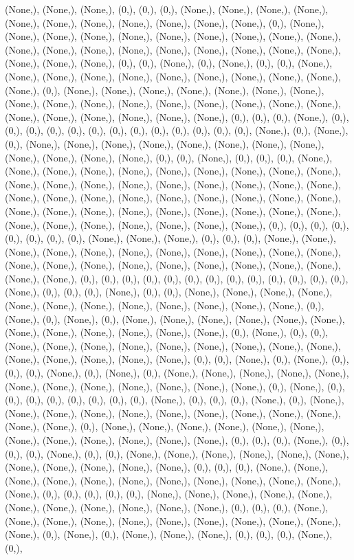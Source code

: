 \documentclass{article}
\begin{document}
(None,), (None,), (None,), (0,), (0,), (0,), (None,), (None,), (None,), (None,), (None,), (None,), (None,), (None,), (None,), (None,), (None,), (0,), (None,), (None,), (None,), (None,), (None,), (None,), (None,), (None,), (None,), (None,), (None,), (None,), (None,), (None,), (None,), (None,), (None,), (None,), (None,), (None,), (None,), (None,), (0,), (0,), (None,), (0,), (None,), (0,), (0,), (None,), (None,), (None,), (None,), (None,), (None,), (None,), (None,), (None,), (None,), (None,), (0,), (None,), (None,), (None,), (None,), (None,), (None,), (None,), (None,), (None,), (None,), (None,), (None,), (None,), (None,), (None,), (None,), (None,), (None,), (None,), (None,), (None,), (None,), (0,), (0,), (0,), (None,), (0,), (0,), (0,), (0,), (0,), (0,), (0,), (0,), (0,), (0,), (0,), (0,), (0,), (None,), (0,), (None,), (0,), (None,), (None,), (None,), (None,), (None,), (None,), (None,), (None,), (None,), (None,), (None,), (None,), (0,), (0,), (None,), (0,), (0,), (0,), (None,), (None,), (None,), (None,), (None,), (None,), (None,), (None,), (None,), (None,), (None,), (None,), (None,), (None,), (None,), (None,), (None,), (None,), (None,), (None,), (None,), (None,), (None,), (None,), (None,), (None,), (None,), (None,), (None,), (None,), (None,), (None,), (None,), (None,), (None,), (None,), (None,), (None,), (None,), (None,), (None,), (None,), (None,), (None,), (0,), (0,), (0,), (0,), (0,), (0,), (0,), (0,), (None,), (None,), (None,), (0,), (0,), (0,), (None,), (None,), (None,), (None,), (None,), (None,), (None,), (None,), (None,), (None,), (None,), (None,), (None,), (None,), (None,), (None,), (None,), (None,), (None,), (None,), (None,), (None,), (0,), (0,), (0,), (0,), (0,), (0,), (0,), (0,), (0,), (0,), (0,), (0,), (0,), (None,), (0,), (0,), (0,), (None,), (0,), (0,), (None,), (None,), (None,), (None,), (None,), (None,), (None,), (None,), (None,), (None,), (None,), (None,), (0,), (None,), (0,), (None,), (0,), (None,), (None,), (None,), (None,), (None,), (None,), (None,), (None,), (None,), (None,), (None,), (None,), (0,), (None,), (0,), (0,), (None,), (None,), (None,), (None,), (None,), (None,), (None,), (None,), (None,), (None,), (None,), (None,), (None,), (None,), (0,), (0,), (None,), (0,), (None,), (0,), (0,), (0,), (None,), (0,), (None,), (0,), (None,), (None,), (None,), (None,), (None,), (None,), (None,), (None,), (None,), (None,), (None,), (None,), (0,), (None,), (0,), (0,), (0,), (0,), (0,), (0,), (0,), (0,), (None,), (0,), (0,), (0,), (None,), (0,), (None,), (None,), (None,), (None,), (None,), (None,), (None,), (None,), (None,), (None,), (None,), (None,), (0,), (None,), (None,), (None,), (None,), (None,), (None,), (None,), (None,), (None,), (None,), (None,), (None,), (0,), (0,), (0,), (None,), (0,), (0,), (0,), (None,), (0,), (0,), (None,), (None,), (None,), (None,), (None,), (None,), (None,), (None,), (None,), (None,), (None,), (0,), (0,), (0,), (None,), (None,), (None,), (None,), (None,), (None,), (None,), (None,), (None,), (None,), (None,), (None,), (0,), (0,), (0,), (0,), (0,), (None,), (None,), (None,), (None,), (None,), (None,), (None,), (None,), (None,), (None,), (None,), (0,), (0,), (0,), (None,), (None,), (None,), (None,), (None,), (None,), (None,), (None,), (None,), (None,), (None,), (0,), (None,), (0,), (None,), (None,), (None,), (0,), (0,), (0,), (None,), (0,), 
\end{document}

